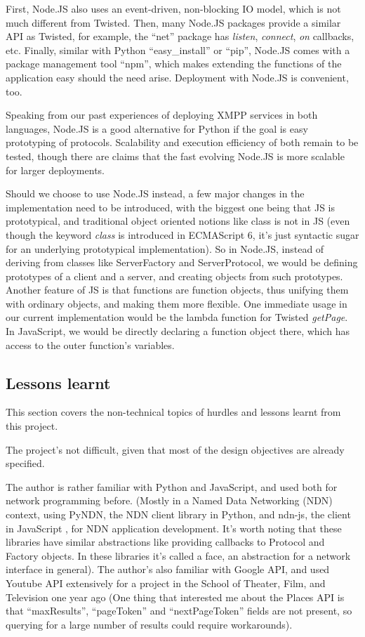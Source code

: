 \documentclass[letterpaper,twocolumn,10pt]{article}
\begin{document}
First, Node.JS also uses an event-driven, non-blocking IO model, which is not much different from Twisted. Then, many Node.JS packages provide a similar API as Twisted, for example, the ``net'' package has \textit{listen}, \textit{connect}, \textit{on} callbacks, etc. Finally, similar with Python ``easy\_install'' or ``pip'', Node.JS comes with a package management tool ``npm'', which makes extending the functions of the application easy should the need arise. Deployment with Node.JS is convenient, too.

Speaking from our past experiences of deploying XMPP services in both languages, Node.JS is a good alternative for Python if the goal is easy prototyping of protocols. Scalability and execution efficiency of both remain to be tested, though there are claims that the fast evolving Node.JS is more scalable for larger deployments\cite{NodeJSClaim}.

Should we choose to use Node.JS instead, a few major changes in the implementation need to be introduced, with the biggest one being that JS is prototypical, and traditional object oriented notions like class is not in JS (even though the keyword \textit{class} is introduced in ECMAScript 6\cite{JSClass}, it's just syntactic sugar for an underlying prototypical implementation). So in Node.JS, instead of deriving from classes like ServerFactory and ServerProtocol, we would be defining prototypes of a client and a server, and creating objects from such prototypes. Another feature of JS is that functions are function objects, thus unifying them with ordinary objects, and making them more flexible. One immediate usage in our current implementation would be the lambda function for Twisted \textit{getPage}. In JavaScript, we would be directly declaring a function object there, which has access to the outer function's variables.

\subsection{Lessons learnt}

This section covers the non-technical topics of hurdles and lessons learnt from this project.

The project's not difficult, given that most of the design objectives are already specified. 

The author is rather familiar with Python and JavaScript, and used both for network programming before. (Mostly in a Named Data Networking (NDN) context, using PyNDN, the NDN client library in Python, and ndn-js, the client in JavaScript \cite{NDNCCLDoc}, for NDN application development. It's worth noting that these libraries have similar abstractions like providing callbacks to Protocol and Factory objects. In these libraries it's called a face, an abstraction for a network interface in general). The author's also familiar with Google API, and used Youtube API extensively for a project in the School of Theater, Film, and Television one year ago (One thing that interested me about the Places API is that ``maxResults'', ``pageToken'' and ``nextPageToken'' fields are not present, so querying for a large number of results could require workarounds).
\end{document}
